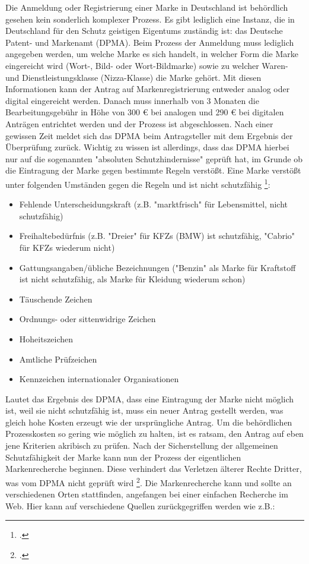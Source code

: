 Die Anmeldung oder Registrierung einer Marke in Deutschland ist behördlich gesehen kein sonderlich komplexer Prozess. Es gibt lediglich eine Instanz, die in Deutschland für den Schutz geistigen Eigentums zuständig ist: das Deutsche Patent- und Markenamt (DPMA). Beim Prozess der Anmeldung muss lediglich angegeben werden, um welche Marke es sich handelt, in welcher Form die Marke eingereicht wird (Wort-, Bild- oder Wort-Bildmarke) sowie zu welcher Waren- und Dienstleistungsklasse (Nizza-Klasse) die Marke gehört. Mit diesen Informationen kann der Antrag auf Markenregistrierung entweder analog oder digital eingereicht werden. Danach muss innerhalb von 3 Monaten die Bearbeitungsgebühr in Höhe von 300 € bei analogen und 290 € bei digitalen Anträgen entrichtet werden und der Prozess ist abgeschlossen. Nach einer gewissen Zeit meldet sich das DPMA beim Antragsteller mit dem Ergebnis der Überprüfung zurück. Wichtig zu wissen ist allerdings, dass das DPMA hierbei nur auf die sogenannten "absoluten Schutzhindernisse" geprüft hat, im Grunde ob die Eintragung der Marke gegen bestimmte Regeln verstößt. Eine Marke verstößt unter folgenden Umständen gegen die Regeln und ist nicht schutzfähig \footcite{oa_markenrecht_nodate}: 

\begin{itemize}
    \item Fehlende Unterscheidungskraft (z.B. "marktfrisch" für Lebensmittel, nicht schutzfähig)
    \item Freihaltebedürfnis (z.B. "Dreier" für KFZs (BMW) ist schutzfähig, "Cabrio" für KFZs wiederum nicht)
    \item Gattungsangaben/übliche Bezeichnungen ("Benzin" als Marke für Kraftstoff ist nicht schutzfähig, als Marke für Kleidung wiederum schon)
    \item Täuschende Zeichen
    \item Ordnungs- oder sittenwidrige Zeichen
    \item Hoheitszeichen
    \item Amtliche Prüfzeichen
    \item Kennzeichen internationaler Organisationen
\end{itemize}

Lautet das Ergebnis des DPMA, dass eine Eintragung der Marke nicht möglich ist, weil sie nicht schutzfähig ist, muss ein neuer Antrag gestellt werden, was gleich hohe Kosten erzeugt wie der ursprüngliche Antrag. Um die behördlichen Prozesskosten so gering wie möglich zu halten, ist es ratsam, den Antrag auf eben jene Kriterien akribisch zu prüfen. Nach der Sicherstellung der allgemeinen Schutzfähigkeit der Marke kann nun der Prozess der eigentlichen Markenrecherche beginnen. Diese verhindert das Verletzen älterer Rechte Dritter, was vom DPMA nicht geprüft wird \footcite{oa_markenrecht_nodate}. Die Markenrecherche kann und sollte an verschiedenen Orten stattfinden, angefangen bei einer einfachen Recherche im Web. Hier kann auf verschiedene Quellen zurückgegriffen werden wie z.B.:

